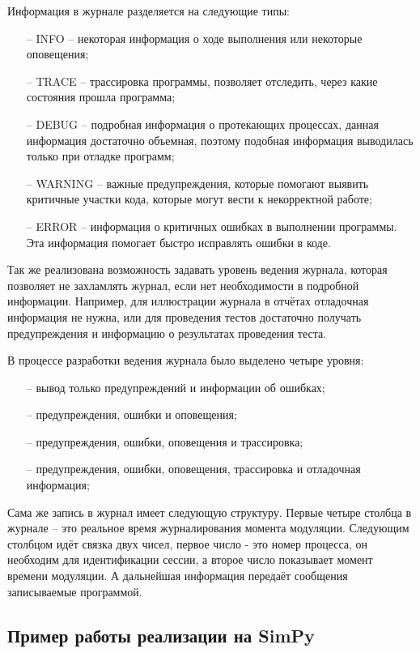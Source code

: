 		Информация в журнале разделяется на следующие типы:
			\begin{itemize}
				\item[--] INFO -- некоторая информация о ходе выполнения или некоторые оповещения;
				\item[--] TRACE -- трассировка программы, позволяет отследить, через какие состояния прошла программа;
				\item[--] DEBUG -- подробная информация о протекающих процессах, данная информация достаточно объемная,
					поэтому подобная информация выводилась только при отладке программ;
				\item[--] WARNING -- важные предупреждения, которые помогают выявить критичные участки кода,
					которые могут вести к некорректной работе;
				\item[--] ERROR -- информация о критичных ошибках в выполнении программы. Эта информация помогает
					быстро исправлять ошибки в коде.
			\end{itemize}

		Так же реализована возможность задавать уровень ведения журнала, которая позволяет не захламлять журнал,
			если нет необходимости в подробной информации. Например, для иллюстрации журнала в отчётах
			отладочная информация не нужна, или для проведения тестов достаточно получать предупреждения
			и информацию о результатах проведения теста.

		В процессе разработки ведения журнала было выделено четыре уровня:
			\begin{itemize}
				\item[--] вывод только предупреждений и информации об ошибках;
				\item[--] предупреждения, ошибки и оповещения;
				\item[--] предупреждения, ошибки, оповещения и трассировка;
				\item[--] предупреждения, ошибки, оповещения, трассировка и отладочная информация;
			\end{itemize}

		Сама же запись в журнал имеет следующую структуру.
		Первые четыре столбца в журнале -- это реальное время журналирования момента модуляции.
		Следующим столбцом идёт связка двух чисел, первое число - это номер процесса,
		он необходим для идентификации сессии, а второе число показывает момент времени модуляции.
		А дальнейшая информация передаёт сообщения записываемые программой.

	\subsection{Пример работы реализации на SimPy}

